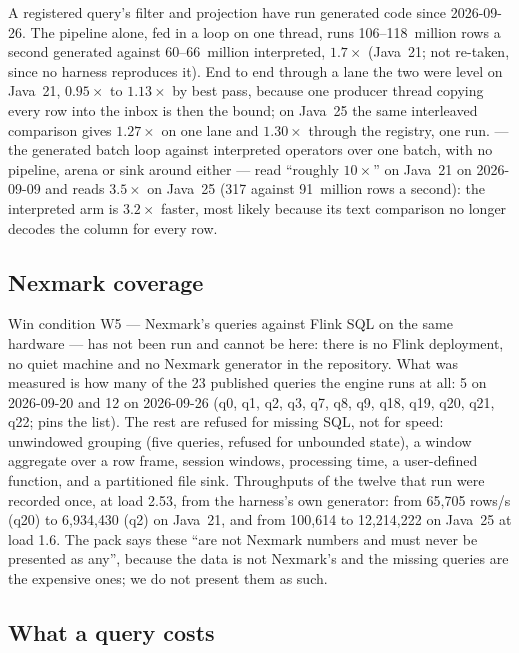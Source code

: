 \documentclass[11pt,a4paper]{article}
\renewcommand{\_}{\oldunderscore\allowbreak}
\newcommand{\cls}[1]{\texttt{\pvbreakable{#1}}}
\begin{document}
A registered query's filter and projection have run generated code since 2026-09-26. The pipeline
alone, fed in a loop on one thread, runs 106--118~million rows a second generated against 60--66~million
interpreted, $1.7\times$ (Java~21; not re-taken, since no harness reproduces it). End to end through a
lane the two were level on Java~21, $0.95\times$ to $1.13\times$ by best pass, because one producer
thread copying every row into the inbox is then the bound; on Java~25 the same interleaved comparison
gives $1.27\times$ on one lane and $1.30\times$ through the registry, one run. \cls{ProfileABenchmark}
--- the generated batch loop against interpreted operators over one batch, with no pipeline, arena or
sink around either --- read ``roughly $10\times$'' on Java~21 on 2026-09-09 and reads $3.5\times$ on
Java~25 (317 against 91~million rows a second): the interpreted arm is $3.2\times$ faster, most likely
because its text comparison no longer decodes the column for every row.

\subsection{Nexmark coverage}

Win condition W5 --- Nexmark's queries against Flink SQL on the same hardware --- has not been run and
cannot be here: there is no Flink deployment, no quiet machine and no Nexmark generator in the
repository. What was measured is how many of the 23 published queries the engine runs at all: 5 on
2026-09-20 and 12 on 2026-09-26 (q0, q1, q2, q3, q7, q8, q9, q18, q19, q20, q21, q22;
\cls{NexmarkCoverageIT} pins the list). The rest are refused for missing SQL, not for speed: unwindowed
grouping (five queries, refused for unbounded state), a window aggregate over a row frame, session
windows, processing time, a user-defined function, and a partitioned file sink. Throughputs of the
twelve that run were recorded once, at load 2.53, from the harness's own generator: from 65{,}705 rows/s
(q20) to 6{,}934{,}430 (q2) on Java~21, and from 100{,}614 to 12{,}214{,}222 on Java~25 at load 1.6. The pack says these ``are not Nexmark numbers and must never be presented as
any'', because the data is not Nexmark's and the missing queries are the expensive ones; we do not
present them as such.

\subsection{What a query costs}
\end{document}
